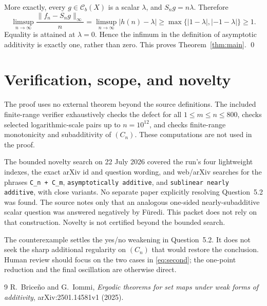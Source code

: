 \documentclass[11pt]{article}
\newcommand{\Cb}{\mathcal C_b}
\begin{document}
More exactly, every $g\in\Cb(X)$ is a scalar $\lambda$, and
$S_ng=n\lambda$. Therefore
\[
 \limsup_{n\to\infty}\frac{\|f_n-S_ng\|_\infty}{n}
 =\limsup_{n\to\infty}|h(n)-\lambda|
 \geq\max\{|1-\lambda|,|-1-\lambda|\}\geq1.
\]
Equality is attained at $\lambda=0$. Hence the infimum in the definition of
asymptotic additivity is exactly one, rather than zero. This proves
Theorem~\ref{thm:main}. \qed

\section{Verification, scope, and novelty}

The proof uses no external theorem beyond the source definitions. The included
finite-range verifier exhaustively checks the defect for all
$1\leq m\leq n\leq800$, checks selected logarithmic-scale pairs up to
$n=10^{12}$, and checks finite-range monotonicity and subadditivity of
$(C_n)$. These computations are not used in the proof.

The bounded novelty search on 22 July 2026 covered the run's four lightweight
indexes, the exact arXiv id and question wording, and web/arXiv searches for
the phrases \texttt{C\_n + C\_m}, \texttt{asymptotically additive}, and
\texttt{sublinear nearly additive}, with close variants. No separate paper
explicitly resolving Question~5.2 was found. The source notes only that an
analogous one-sided nearly-subadditive scalar question was answered negatively
by F\"uredi. This packet does not rely on that construction. Novelty is not
certified beyond the bounded search.

The counterexample settles the yes/no weakening in Question~5.2. It does not
seek the sharp additional regularity on $(C_n)$ that would restore the
conclusion. Human review should focus on the two cases in
\eqref{eq:second}; the one-point reduction and the final oscillation are
otherwise direct.

\begin{thebibliography}{9}
R.~Brice\~no and G.~Iommi,
\emph{Ergodic theorems for set maps under weak forms of additivity},
arXiv:2501.14581v1 (2025).
\end{thebibliography}
\end{document}
